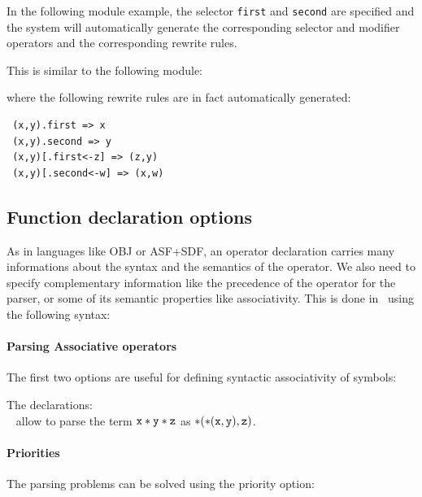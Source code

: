 \EX
In the following module example, the selector {\tt first} and {\tt second}
are specified and the system will automatically generate the
corresponding selector and modifier operators and the corresponding
rewrite rules.


\noindent
This is similar to the following module:


\noindent
where the following rewrite rules are in fact automatically generated:
\begin{verbatim}
 (x,y).first => x              
 (x,y).second => y
 (x,y)[.first<-z] => (z,y)     
 (x,y)[.second<-w] => (x,w)
\end{verbatim}

\FEX

\subsection{Function declaration options}

As in languages like OBJ or ASF+SDF, an operator declaration carries
many informations about the syntax and the semantics of the
operator. We also need to specify complementary information like the
precedence of the operator for the parser, or some of its semantic
properties like associativity. This is done in \elan\ using the
following syntax:


\paragraph{Parsing Associative operators}
The first two options are useful for defining syntactic associativity
of symbols:

\EX
The declarations:\\
{\tt 
{}
}
allow to parse the term $\tt x * y * z$ as $\tt *(*(x,y),z)$.
\FEX

\paragraph{Priorities}
The  parsing problems can be solved using the priority
option: 

